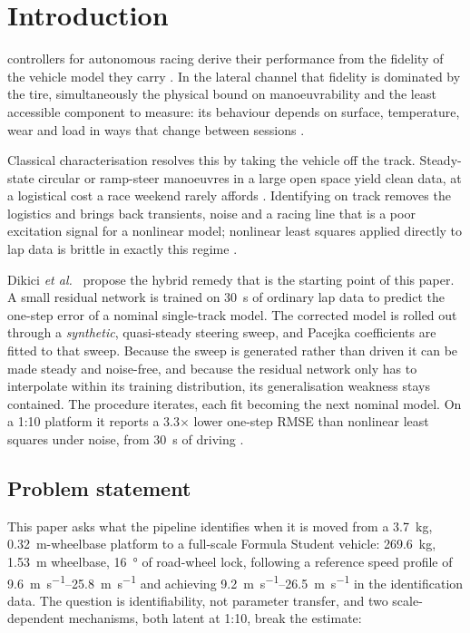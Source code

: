 \section{Introduction}

 controllers for autonomous racing derive their
performance from the fidelity of the vehicle model they carry
\cite{liniger2015,kabzan2019lbmpc,forzaeth2024}. In the lateral channel that
fidelity is dominated by the tire, simultaneously the physical bound on
manoeuvrability and the least accessible component to measure: its behaviour
depends on surface, temperature, wear and load in ways that change between
sessions \cite{pacejka2012book,amz2020}.

Classical characterisation resolves this by taking the vehicle off the track.
Steady-state circular or ramp-steer manoeuvres in a large open space yield
clean data, at a logistical cost a race weekend rarely affords
\cite{ontrack2025}. Identifying on track removes the logistics and brings back
transients, noise and a racing line that is a poor excitation signal for a
nonlinear model; nonlinear least squares applied directly to lap data is
brittle in exactly this regime \cite{ontrack2025}.

Dikici \emph{et al.}~\cite{ontrack2025} propose the hybrid remedy that is the
starting point of this paper. A small residual network is trained on
\SI{30}{\second} of ordinary lap data to predict the one-step error of a
nominal single-track model. The corrected model is rolled out through a
\emph{synthetic}, quasi-steady steering sweep, and Pacejka coefficients are
fitted to that sweep. Because the sweep is generated rather than driven it can
be made steady and noise-free, and because the residual network only has to
interpolate within its training distribution, its generalisation weakness stays
contained. The procedure iterates, each fit becoming the next nominal model. On
a 1:10 platform it reports a \num{3.3}$\times$ lower one-step RMSE than
nonlinear least squares under noise, from \SI{30}{\second} of driving
\cite{ontrack2025}.

\subsection{Problem statement}

This paper asks what the pipeline identifies when it is moved from a
\SI{3.7}{\kilo\gram}, \SI{0.32}{\meter}-wheelbase platform to a full-scale
Formula Student vehicle: \SI{269.6}{\kilo\gram}, \SI{1.53}{\meter} wheelbase,
\SI{16}{\degree} of road-wheel lock, following a reference speed profile of
\SIrange{9.6}{25.8}{\meter\per\second} and achieving
\SIrange{9.2}{26.5}{\meter\per\second} in the identification data. The
question is identifiability, not parameter transfer, and two scale-dependent
mechanisms, both latent at 1:10, break the estimate:

